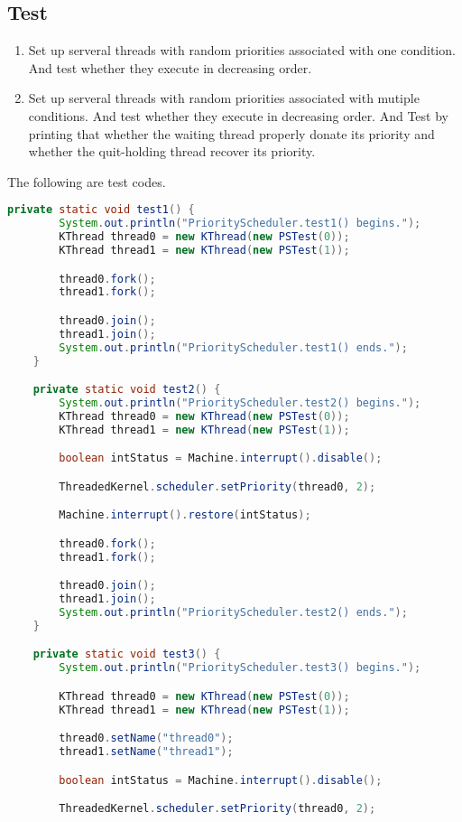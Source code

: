 \documentclass{article}
\begin{document}
\subsection{Test}
\begin{enumerate}
	\item Set up serveral threads with random priorities associated with one condition. And test whether they execute in decreasing order.
	\item Set up serveral threads with random priorities associated with mutiple conditions. And test whether they execute in decreasing order. And
		Test by printing that whether the waiting thread properly donate its priority and whether the quit-holding thread recover its priority.
\end{enumerate}
The following are test codes.
\begin{lstlisting}[language=java]
private static void test1() {
		System.out.println("PriorityScheduler.test1() begins.");
		KThread thread0 = new KThread(new PSTest(0));
		KThread thread1 = new KThread(new PSTest(1));

		thread0.fork();
		thread1.fork();

		thread0.join();
		thread1.join();
		System.out.println("PriorityScheduler.test1() ends.");
	}

	private static void test2() {
		System.out.println("PriorityScheduler.test2() begins.");
		KThread thread0 = new KThread(new PSTest(0));
		KThread thread1 = new KThread(new PSTest(1));

		boolean intStatus = Machine.interrupt().disable();

		ThreadedKernel.scheduler.setPriority(thread0, 2);

		Machine.interrupt().restore(intStatus);

		thread0.fork();
		thread1.fork();

		thread0.join();
		thread1.join();
		System.out.println("PriorityScheduler.test2() ends.");
	}

	private static void test3() {
		System.out.println("PriorityScheduler.test3() begins.");

		KThread thread0 = new KThread(new PSTest(0));
		KThread thread1 = new KThread(new PSTest(1));

		thread0.setName("thread0");
		thread1.setName("thread1");

		boolean intStatus = Machine.interrupt().disable();

		ThreadedKernel.scheduler.setPriority(thread0, 2);


\end{lstlisting}
\end{document}
